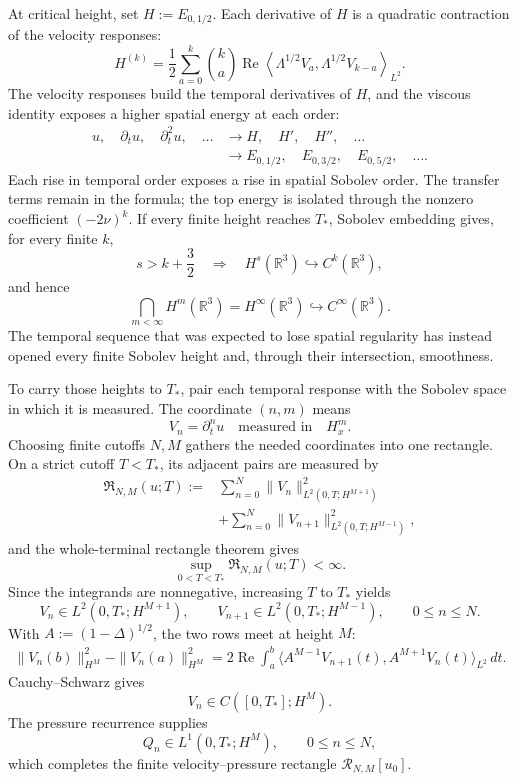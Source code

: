 \documentclass[11pt]{article}
\newcommand{\R}{\mathbb R}
\begin{document}
At critical height, set \(H:=E_{0,1/2}\). Each derivative of \(H\) is a
quadratic contraction of the velocity responses:
\[
  H^{(k)}
  =\frac12\sum_{a=0}^{k}\binom{k}{a}
  \operatorname{Re}
  \left\langle
    \Lambda^{1/2}V_a,
    \Lambda^{1/2}V_{k-a}
  \right\rangle_{L^2}.
\]
The velocity responses build the temporal derivatives of \(H\), and the viscous
identity exposes a higher spatial energy at each order:
\[
\begin{aligned}
  u,\quad \partial_tu,\quad \partial_t^2u,\quad\ldots
  &\longrightarrow
  H,\quad H',\quad H'',\quad\ldots
  \\
  &\longrightarrow
  E_{0,1/2},\quad E_{0,3/2},\quad E_{0,5/2},\quad\ldots .
\end{aligned}
\]
Each rise in temporal order exposes a rise in spatial Sobolev order. The
transfer terms remain in the formula; the top energy is isolated through the
nonzero coefficient \((-2\nu)^k\). If every finite height reaches \(T_*\),
Sobolev embedding gives, for every finite \(k\),
\[
  s>k+\frac32
  \quad\Longrightarrow\quad
  H^s(\R^3)\hookrightarrow C^k(\R^3),
\]
and hence
\[
  \bigcap_{m<\infty}H^m(\R^3)
  =H^\infty(\R^3)
  \hookrightarrow C^\infty(\R^3).
\]
The temporal sequence that was expected to lose spatial regularity has instead
opened every finite Sobolev height and, through their intersection, smoothness.

To carry those heights to \(T_*\), pair each temporal response with the Sobolev
space in which it is measured. The coordinate \((n,m)\) means
\[
  V_n=\partial_t^nu
  \quad\text{measured in}\quad
  H_x^m.
\]
Choosing finite cutoffs \(N,M\) gathers the needed coordinates into one
rectangle. On a strict cutoff \(T<T_*\), its adjacent pairs are measured by
\[
\begin{aligned}
  \mathfrak R_{N,M}(u;T)
  :={}&
  \sum_{n=0}^{N}
  \|V_n\|_{L^2(0,T;H^{M+1})}^2
  \\
  &+
  \sum_{n=0}^{N}
  \|V_{n+1}\|_{L^2(0,T;H^{M-1})}^2,
\end{aligned}
\]
and the whole-terminal rectangle theorem gives
\[
  \sup_{0<T<T_*}\mathfrak R_{N,M}(u;T)<\infty.
\]
Since the integrands are nonnegative, increasing \(T\) to \(T_*\) yields
\[
  V_n\in L^2(0,T_*;H^{M+1}),
  \qquad
  V_{n+1}\in L^2(0,T_*;H^{M-1}),
  \qquad 0\leq n\leq N.
\]
With \(A:=(1-\Delta)^{1/2}\), the two rows meet at height \(M\):
\[
\begin{aligned}
  \|V_n(b)\|_{H^M}^2-\|V_n(a)\|_{H^M}^2
  =2\operatorname{Re}\int_a^b
  \bigl\langle
    A^{M-1}V_{n+1}(t),
    A^{M+1}V_n(t)
  \bigr\rangle_{L^2}\,dt.
\end{aligned}
\]
Cauchy--Schwarz gives
\[
  V_n\in C([0,T_*];H^M).
\]
The pressure recurrence supplies
\[
  Q_n\in L^1(0,T_*;H^M),
  \qquad
  0\leq n\leq N,
\]
which completes the finite velocity--pressure rectangle
\(\mathcal R_{N,M}[u_0]\).
\end{document}
